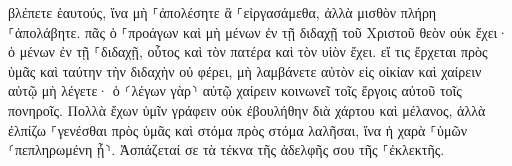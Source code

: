 \documentclass{openreader}
\begin{document}
βλέπετε ἑαυτούς, ἵνα μὴ ⸀ἀπολέσητε ἃ ⸀εἰργασάμεθα, ἀλλὰ μισθὸν πλήρη ⸀ἀπολάβητε. 
πᾶς ὁ ⸀προάγων καὶ μὴ μένων ἐν τῇ διδαχῇ τοῦ Χριστοῦ θεὸν οὐκ ἔχει· ὁ μένων ἐν τῇ ⸀διδαχῇ, οὗτος καὶ τὸν πατέρα καὶ τὸν υἱὸν ἔχει. 
εἴ τις ἔρχεται πρὸς ὑμᾶς καὶ ταύτην τὴν διδαχὴν οὐ φέρει, μὴ λαμβάνετε αὐτὸν εἰς οἰκίαν καὶ χαίρειν αὐτῷ μὴ λέγετε· 
ὁ ⸂λέγων γὰρ⸃ αὐτῷ χαίρειν κοινωνεῖ τοῖς ἔργοις αὐτοῦ τοῖς πονηροῖς. 
Πολλὰ ἔχων ὑμῖν γράφειν οὐκ ἐβουλήθην διὰ χάρτου καὶ μέλανος, ἀλλὰ ἐλπίζω ⸀γενέσθαι πρὸς ὑμᾶς καὶ στόμα πρὸς στόμα λαλῆσαι, ἵνα ἡ χαρὰ ⸀ὑμῶν ⸂πεπληρωμένη ᾖ⸃. 
Ἀσπάζεταί σε τὰ τέκνα τῆς ἀδελφῆς σου τῆς ⸀ἐκλεκτῆς. 
\end{document}
